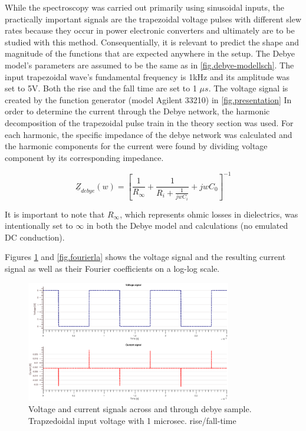 While the spectroscopy was carried out primarily using sinusoidal inputs,
the practically important signals are the trapezoidal voltage pulses with different
slew rates because they occur in power electronic converters and ultimately are to be studied with this method.  Consequentially, it is relevant to predict the shape and magnitude
of the functions that are expected anywhere in the setup. 
The Debye model's parameters are assumed to be the same as in \ref{fig.debye-modellsch}.
The input trapezoidal wave's fundamental frequency is 1kHz and its amplitude was
set to 5V. Both the rise and 
the fall time are set to 1 $\mu s$. The voltage signal is created
by the function generator (model Agilent 33210) in \ref{fig.presentation}
\newline
In order to determine the current through the Debye network, the harmonic decomposition of
the trapezoidal pulse train in the theory section was used. For each harmonic, the specific
impedance of the debye network was calculated and the harmonic components for the current were found by dividing voltage component by its corresponding impedance.

\begin{equation}
 \underline{Z}_{debye}(w)=\left[\frac{1}{R_{\infty}}+\frac{1}{R_{i}+\frac{1}{jwC_{i}}}+jwC_{0}\right]^{-1}
 \label{debyeimpedance}
\end{equation}

It is important to note that $R_{\infty}$, which represents
ohmic losses in dielectrics, was intentionally set to $\infty$ in both the Debye model and calculations (no emulated DC conduction).

Figures \ref{fig.beforeandafter} and \ref{fig.fourierla} shows the voltage signal and the resulting current signal as well as their Fourier coefficients on a log-log scale.

\begin{figure}[h!tb]
\centerline{\includegraphics[width=0.8\textwidth]{figures/Method/signal_simulation/beforeandafter.eps}}
\caption{Voltage and current signals across and through debye sample. Trapzedoidal input voltage with 1 microsec. rise/fall-time}
\label{fig.beforeandafter}
\end{figure}

